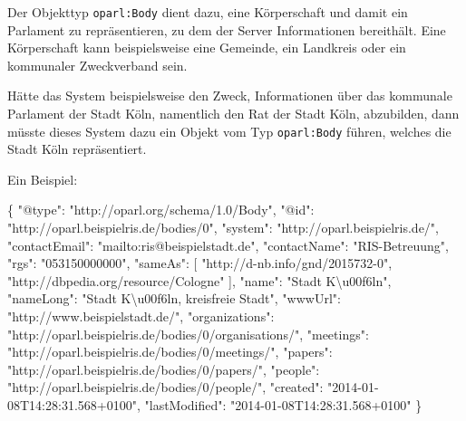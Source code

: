 \documentclass[,a4paper]{article}
\newenvironment{Shaded}{}{}
\newcommand{\DataTypeTok}[1]{\textcolor[rgb]{0.56,0.13,0.00}{{#1}}}
\newcommand{\StringTok}[1]{\textcolor[rgb]{0.25,0.44,0.63}{{#1}}}
\newcommand{\NormalTok}[1]{{#1}}
\begin{document}

Der Objekttyp \texttt{oparl:Body} dient dazu, eine Körperschaft und
damit ein Parlament zu repräsentieren, zu dem der Server Informationen
bereithält. Eine Körperschaft kann beispielsweise eine Gemeinde, ein
Landkreis oder ein kommunaler Zweckverband sein.

Hätte das System beispielsweise den Zweck, Informationen über das
kommunale Parlament der Stadt Köln, namentlich den Rat der Stadt Köln,
abzubilden, dann müsste dieses System dazu ein Objekt vom Typ
\texttt{oparl:Body} führen, welches die Stadt Köln repräsentiert.

Ein Beispiel:

\begin{Shaded}
\begin{Highlighting}[]
\NormalTok{\{}
    \DataTypeTok{"@type"}\NormalTok{: }\StringTok{"http://oparl.org/schema/1.0/Body"}\NormalTok{,}
    \DataTypeTok{"@id"}\NormalTok{: }\StringTok{"http://oparl.beispielris.de/bodies/0"}\NormalTok{,}
    \DataTypeTok{"system"}\NormalTok{: }\StringTok{"http://oparl.beispielris.de/"}\NormalTok{,}
    \DataTypeTok{"contactEmail"}\NormalTok{: }\StringTok{"mailto:ris@beispielstadt.de"}\NormalTok{,}
    \DataTypeTok{"contactName"}\NormalTok{: }\StringTok{"RIS-Betreuung"}\NormalTok{,}
    \DataTypeTok{"rgs"}\NormalTok{: }\StringTok{"053150000000"}\NormalTok{,}
    \DataTypeTok{"sameAs"}\NormalTok{: [}
        \StringTok{"http://d-nb.info/gnd/2015732-0"}\NormalTok{,}
        \StringTok{"http://dbpedia.org/resource/Cologne"}
    \NormalTok{],}
    \DataTypeTok{"name"}\NormalTok{: }\StringTok{"Stadt K\textbackslash{}u00f6ln"}\NormalTok{,}
    \DataTypeTok{"nameLong"}\NormalTok{: }\StringTok{"Stadt K\textbackslash{}u00f6ln, kreisfreie Stadt"}\NormalTok{,}
    \DataTypeTok{"wwwUrl"}\NormalTok{: }\StringTok{"http://www.beispielstadt.de/"}\NormalTok{,}
    \DataTypeTok{"organizations"}\NormalTok{: }\StringTok{"http://oparl.beispielris.de/bodies/0/organisations/"}\NormalTok{,}
    \DataTypeTok{"meetings"}\NormalTok{: }\StringTok{"http://oparl.beispielris.de/bodies/0/meetings/"}\NormalTok{,}
    \DataTypeTok{"papers"}\NormalTok{: }\StringTok{"http://oparl.beispielris.de/bodies/0/papers/"}\NormalTok{,}
    \DataTypeTok{"people"}\NormalTok{: }\StringTok{"http://oparl.beispielris.de/bodies/0/people/"}\NormalTok{,}
    \DataTypeTok{"created"}\NormalTok{: }\StringTok{"2014-01-08T14:28:31.568+0100"}\NormalTok{,}
    \DataTypeTok{"lastModified"}\NormalTok{: }\StringTok{"2014-01-08T14:28:31.568+0100"}
\NormalTok{\}}
\end{Highlighting}
\end{Shaded}
\end{document}
